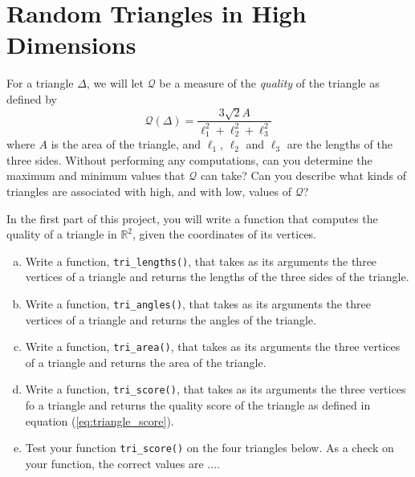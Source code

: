 \section{Random Triangles in High Dimensions}

For a triangle $\Delta$, we will let $\mathcal{Q}$ be a measure of the \textit{quality} of the triangle as defined by
\begin{equation}
\label{eq:triangle_score}
\mathcal{Q}(\Delta) = \frac{3\sqrt{2} A}{ \ell_1^2 + \ell_2^2 + \ell_3^2}
\end{equation}
where $A$ is the area of the triangle, and $\ell_1$, $\ell_2$ and $\ell_3$ are the lengths of the three sides.
Without performing any computations, can you determine the maximum and minimum values that $\mathcal{Q}$ can take? Can you describe what kinds of triangles are associated with high, and with low, values of $\mathcal{Q}$?

In the first part of this project, you will write a function that computes the quality of a triangle in $\mathbb{R}^2$, given the coordinates of its vertices.

\begin{enumerate}[(a)]
  \item Write a function, \texttt{tri\_lengths()}, that takes as its arguments the three vertices of a triangle and returns the lengths of the three sides of the triangle.  
  \item Write a function, \texttt{tri\_angles()}, that takes as its arguments the three vertices of a triangle and returns the angles of the triangle.
  \item Write a function, \texttt{tri\_area()}, that takes as its arguments the three vertices of a triangle and returns the area of the triangle.
  \item Write a function, \texttt{tri\_score()}, that takes as its arguments the three vertices fo a triangle and returns the quality score of the triangle as defined in equation (\ref{eq:triangle_score}). 
  \item Test your function \texttt{tri\_score()} on the four triangles below. As a check on your function, the correct values are ....
\end{enumerate}

\begin{center}
\end{center}

